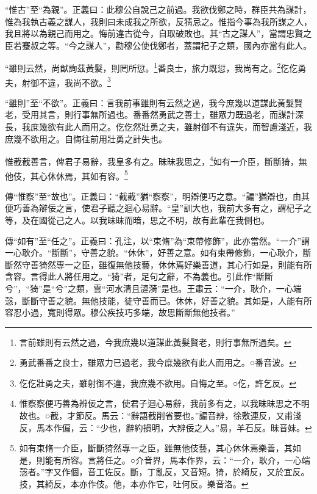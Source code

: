 {\noindent\shu{}\fzkt “惟古”至“為親”。正義曰：此穆公自說己之前過。我欲伐鄭之時，群臣共為謀計，惟為我執古義之謀人，我則曰未成我之所欲，反猜忌之。惟指今事為我所謀之人，我且將以為親己而用之。悔前違古從今，自取破敗也。其“古之謀人”，當謂忠賢之臣若蹇叔之等。“今之謀人”，勸穆公使伐鄭者，蓋謂杞子之類，國內亦當有此人。 \par}

“雖則云然，尚猷詢茲黃髮，則罔所愆。\footnote{言前雖則有云然之過，今我庶幾以道謀此黃髮賢老，則行事無所過矣。}番良士，旅力既愆，我尚有之。\footnote{勇武番番之良士，雖眾力已過老，我今庶幾欲有此人而用之。○番音波。}仡仡勇夫，射御不違，我尚不欲。\footnote{仡仡壯勇之夫，雖射御不違，我庶幾不欲用。自悔之至。○仡，許乞反。}


{\noindent\shu{}\fzkt “雖則”至“不欲”。正義曰：言我前事雖則有云然之過，我今庶幾以道謀此黃髮賢老，受用其言，則行事無所過也。番番然勇武之善士，雖眾力既過老，而謀計深長，我庶幾欲有此人而用之。仡仡然壯勇之夫，雖射御不有違失，而智慮淺近，我庶幾不欲用之。自悔往前用壯勇之計失也。 \par}

惟截截善言，俾君子易辭，我皇多有之。昧昧我思之，\footnote{惟察察便巧善為辨佞之言，使君子迴心易辭，我前多有之，以我昧昧思之不明故也。○截，才節反。馬云：“辭語截削省要也。”諞音辨，徐敷連反，又甫淺反，馬本作偏，云：“少也，辭約損明，大辨佞之人。”易，羊石反。昧音妹。}如有一介臣，斷斷猗，無他伎，其心休休焉，其如有容。\footnote{如有束脩一介臣，斷斷猗然專一之臣，雖無他伎藝，其心休休焉樂善，其如是，則能有所容。言將任之。○介音界，馬本作界，云：“一介，耿介，一心端愨者。”字又作個，音工佐反。斷，丁亂反，又音短。猗，於綺反，又於宜反。技，其綺反，本亦作伎。他，本亦作它，吐何反。樂音洛。}


{\noindent\zhuan{}\fzbyks 傳“惟察”至“故也”。正義曰：“截截”猶“察察”，明辯便巧之意。“諞”猶辯也，由其便巧善為辯佞之言，使君子聽之迴心易辭。“皇”訓大也，我前大多有之，謂杞子之等，及在國從己之人。以我昧昧而暗，思之不明，故有此輩在我側也。 \par}

{\noindent\zhuan{}\fzbyks 傳“如有”至“任之”。正義曰：孔注，以“束脩”為“束帶修飾”，此亦當然。“一介”謂一心耿介。“斷斷”，守善之貌。“休休”，好善之意。如有束帶修飾，一心耿介，斷斷然守善猗然專一之臣，雖復無他技藝，休休焉好樂善道，其心行如是，則能有所含容。言得此人將任用之。“猗”者，足句之辭，不為義也。引此作“斷斷兮”，“猗”是“兮”之類，雲“河水清且漣漪”是也。王肅云：“一介，耿介，一心端愨，斷斷守善之貌。無他技能，徒守善而已。休休，好善之貌。其如是，人能有所容忍小過，寬則得眾。穆公疾技巧多端，故思斷斷無他技者。” \par}

